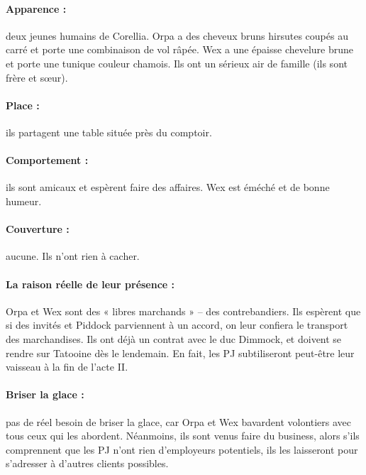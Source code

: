 \documentclass[a4paper,10pt,twoside,twocolumn,openany]{book}
\begin{document}
\paragraph{Apparence :} deux jeunes humains de Corellia. Orpa a
des cheveux bruns hirsutes coupés au carré et porte une
combinaison de vol râpée. Wex a une épaisse chevelure
brune et porte une tunique couleur chamois. Ils ont un
sérieux air de famille (ils sont frère et sœur).
\paragraph{Place :} ils partagent une table située près du comptoir.
\paragraph{Comportement :} ils sont amicaux et espèrent faire des
affaires. Wex est éméché et de bonne humeur.
\paragraph{Couverture :} aucune. Ils n’ont rien à cacher.

\paragraph{La raison réelle de leur présence :} Orpa et Wex
sont des « libres marchands » – des contrebandiers. Ils
espèrent que si des invités et Piddock parviennent à
un accord, on leur confiera le transport des marchandises. Ils ont déjà un contrat avec le duc Dimmock, et
doivent se rendre sur Tatooine dès le lendemain. En
fait, les PJ subtiliseront peut-être leur vaisseau à la fin
de l’acte II.
\paragraph{Briser la glace :} pas de réel besoin de briser la glace,
car Orpa et Wex bavardent volontiers avec tous ceux
qui les abordent. Néanmoins, ils sont venus faire du business, alors s’ils comprennent que les PJ n’ont rien d’employeurs potentiels, ils les laisseront pour s’adresser à
d’autres clients possibles.
\end{document}

